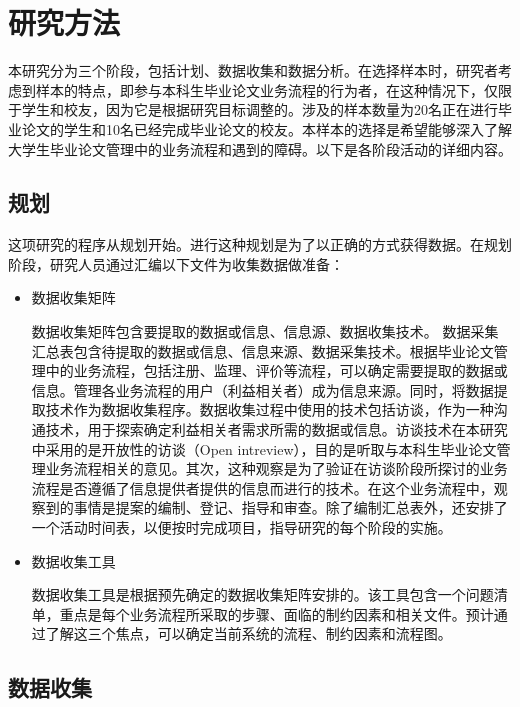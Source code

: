 
\chapter{研究方法}
\label{研究方法}

本研究分为三个阶段，包括计划、数据收集和数据分析。在选择样本时，研究者考虑到样本的特点，即参与本科生毕业论文业务流程的行为者，在这种情况下，仅限于学生和校友，因为它是根据研究目标调整的。涉及的样本数量为20名正在进行毕业论文的学生和10名已经完成毕业论文的校友。本样本的选择是希望能够深入了解大学生毕业论文管理中的业务流程和遇到的障碍。以下是各阶段活动的详细内容。

\section{规划}

这项研究的程序从规划开始。进行这种规划是为了以正确的方式获得数据。在规划阶段，研究人员通过汇编以下文件为收集数据做准备：

\begin{itemize}
    \item 数据收集矩阵

          数据收集矩阵包含要提取的数据或信息、信息源、数据收集技术。
          数据采集汇总表包含待提取的数据或信息、信息来源、数据采集技术。根据毕业论文管理中的业务流程，包括注册、监理、评价等流程，可以确定需要提取的数据或信息。管理各业务流程的用户（利益相关者）成为信息来源。同时，将数据提取技术作为数据收集程序。数据收集过程中使用的技术包括访谈，作为一种沟通技术，用于探索确定利益相关者需求所需的数据或信息。访谈技术在本研究中采用的是开放性的访谈（Open intreview），目的是听取与本科生毕业论文管理业务流程相关的意见。其次，这种观察是为了验证在访谈阶段所探讨的业务流程是否遵循了信息提供者提供的信息而进行的技术。在这个业务流程中，观察到的事情是提案的编制、登记、指导和审查。除了编制汇总表外，还安排了一个活动时间表，以便按时完成项目，指导研究的每个阶段的实施。

    \item 数据收集工具

          数据收集工具是根据预先确定的数据收集矩阵安排的。该工具包含一个问题清单，重点是每个业务流程所采取的步骤、面临的制约因素和相关文件。预计通过了解这三个焦点，可以确定当前系统的流程、制约因素和流程图。

\end{itemize}

\section{数据收集}


